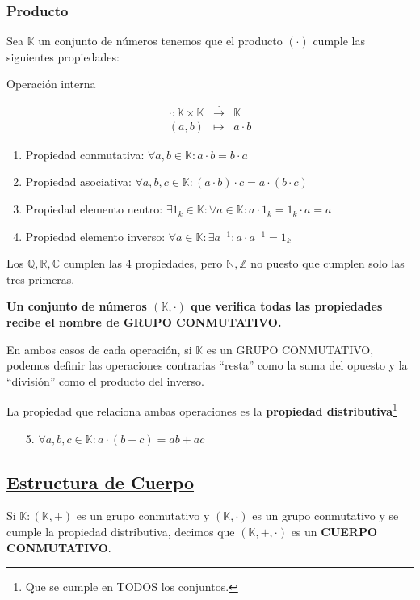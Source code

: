 \documentclass[10pt,a4paper,openright]{book}
\begin{document}
\subsubsection*{Producto}
Sea $\mathbb K$ un conjunto de números tenemos que el producto $(\cdot)$ cumple las siguientes propiedades:
\begin{center}
Operación interna
\end{center}
\begin{eqnarray*}
\cdot: \mathbb K \times\mathbb K & \stackrel{\cdot}{\rightarrow} & \mathbb K \\
(a,b) & \longmapsto  & a\cdot b
\end{eqnarray*}

\begin{enumerate}
\item Propiedad conmutativa: $\forall a, b \in \mathbb K: a\cdot b=b\cdot a$
\item Propiedad asociativa: $\forall a, b, c\in \mathbb K : (a\cdot b)\cdot c=a\cdot (b\cdot c)$
\item Propiedad elemento neutro: $\exists 1_k\in \mathbb K : \forall a \in \mathbb K : a\cdot 1_k=1_k\cdot a=a$
\item Propiedad elemento inverso: $\forall a \in \mathbb K : \exists a^{-1} : a\cdot a^{-1}=1_k$
\end{enumerate}
Los $\mathbb {Q, R, C}$ cumplen las 4 propiedades, pero $\mathbb {N,Z}$ no puesto que cumplen solo las tres primeras.\par
\textbf{Un conjunto de números $(\mathbb K, \cdot)$ que verifica todas las propiedades recibe el nombre de GRUPO CONMUTATIVO.}\par
En ambos casos de cada operación, si $\mathbb K$ es un GRUPO CONMUTATIVO, podemos definir las operaciones contrarias ``resta'' como la suma del opuesto y la ``división'' como el producto del inverso.\par
La propiedad que relaciona ambas operaciones es la \textbf{propiedad distributiva}\footnote{Que se cumple en TODOS los conjuntos.}
\begin{enumerate}
\item[5.] $\forall a,b,c\in \mathbb K: a\cdot (b+c)=ab+ac$
\end{enumerate}

\subsection*{\underline{Estructura de Cuerpo}}
Si $\mathbb K : (\mathbb K, +)$ es un grupo conmutativo y $(\mathbb K, \cdot)$ es un grupo conmutativo y se cumple la propiedad distributiva, decimos que $(\mathbb K, +, \cdot)$ es un \textbf{CUERPO CONMUTATIVO}.
\end{document}
